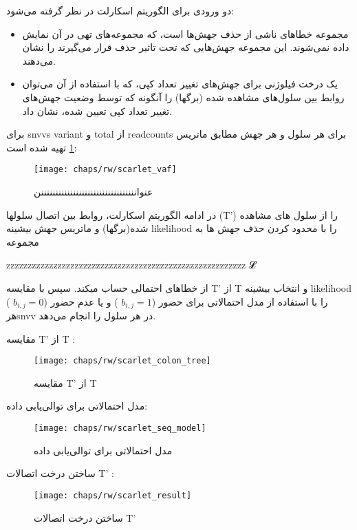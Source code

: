 دو ورودی برای الگوریتم اسکارلت در نظر گرفته می‌شود: 
\begin{itemize}
	\item مجموعه خطاهای ناشی از حذف جهش‌ها است، که مجموعه‌های تهی در آن نمایش داده نمی‌شوند. این مجموعه جهش‌هایی که تحت تاثیر حذف قرار می‌گیرند را نشان می‌دهند. 
	\item یک درخت فیلوژنی برای جهش‌های تغییر تعداد کپی، که با استفاده از آن می‌توان روابط بین سلول‌های مشاهده شده (برگها) را آنگونه که توسط وضعیت جهش‌های تغییر تعداد کپی تعیین شده، نشان داد.
\end{itemize}


 

  

برای \glspl{snvv} \gls{variant}   و  \gls{total}   از  \gls{readcounts} برای هر سلول و هر جهش مطابق ماتریس \ref{fig:ch_rw:scarlet_vaf} تهیه شده است: 

\begin{figure}[!ht]
	\centerline{\texttt{[image: chaps/rw/scarlet\_vaf]}}
	\caption{عنوانننننننننننننننننننننننننننننننننن}
	\label{fig:ch_rw:scarlet_vaf}
\end{figure}


در ادامه  الگوریتم اسکارلت، روابط بین اتصال سلولها (T’) را  از سلول های مشاهده شده(برگها) و ماتریس جهش بیشینه \gls{likelihood}  را با محدود کردن حذف جهش ها به مجموعه

zzzzzzzzzzzzzzzzzzzzzzzzzzzzzzzzzzzzzzzzzzzzzzzzzzzzzzzz
𝓛

از خطاهای احتمالی حساب میکند. سپس با مقایسه T’ از T و انتخاب بیشینه  \gls{likelihood}  را با استفاده از مدل احتمالاتی برای حضور ($b_{i,j} = 1$ )  و یا عدم حضور ($b_{i,j} = 0$ ) هر\gls{snvv} در هر سلول را انجام می‌دهد. 

مقایسه T’ از T :
\begin{figure}[!ht]
	\centerline{\texttt{[image: chaps/rw/scarlet\_colon\_tree]}}
	\caption{مقایسه T’ از T}
	\label{fig:ch_rw:scarlet_colon_tree}
\end{figure}

مدل احتمالاتی برای توالی‌یابی داده:

\begin{figure}[!ht]
	\centerline{\texttt{[image: chaps/rw/scarlet\_seq\_model]}}
	\caption{مدل احتمالاتی برای توالی‌یابی داده}
	\label{fig:ch_rw:scarlet_seq_model}
\end{figure}

ساختن درخت اتصالات T’ : 

\begin{figure}[!ht]
	\centerline{\texttt{[image: chaps/rw/scarlet\_result]}}
	\caption{ساختن درخت اتصالات T’}
	\label{fig:ch_rw:scarlet_result}
\end{figure}

